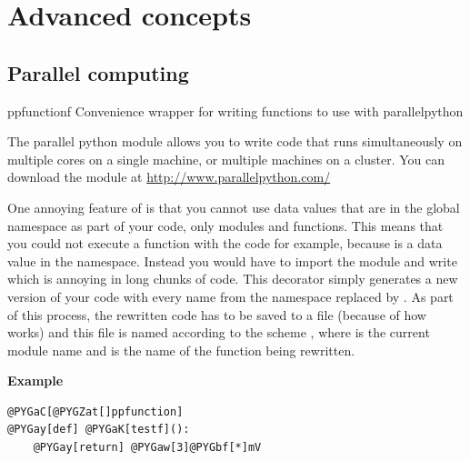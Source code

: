 \documentclass[letterpaper,10pt,english]{manual}
\begin{document}
\chapter{Advanced concepts}

\resetcurrentobjects
\hypertarget{--doc-parallel}{}

\hypertarget{index-114}{}\section{Parallel computing}

\hypertarget{brian.ppfunction}{}\begin{funcdesc}{ppfunction}{f}
Convenience wrapper for writing functions to use with parallelpython

The parallel python module  allows you to write code that runs simultaneously
on multiple cores on a single machine, or multiple machines on a cluster. You can
download the module at \href{http://www.parallelpython.com/}{http://www.parallelpython.com/}

One annoying feature of  is that you cannot use data values that are in the
global namespace as part of your code, only modules and functions. This means that
you could not execute a function with the code  for example, because 
is a data value in the  namespace. Instead you would have to import
the  module and write  which is annoying in long chunks
of code. This decorator simply generates a new version of your code with every
name  from the  namespace replaced by . As part of this
process, the rewritten code has to be saved to a file (because of how  works)
and this file is named according to the scheme
, where  is the current
module name and  is the name of the function being rewritten.

\textbf{Example}

\begin{Verbatim}[commandchars=@\[\]]
@PYGaC[@PYGZat[]ppfunction]
@PYGay[def] @PYGaK[testf]():
    @PYGay[return] @PYGaw[3]@PYGbf[*]mV
\end{Verbatim}
\end{funcdesc}

\resetcurrentobjects
\hypertarget{--doc-efficient}{}
\end{document}
